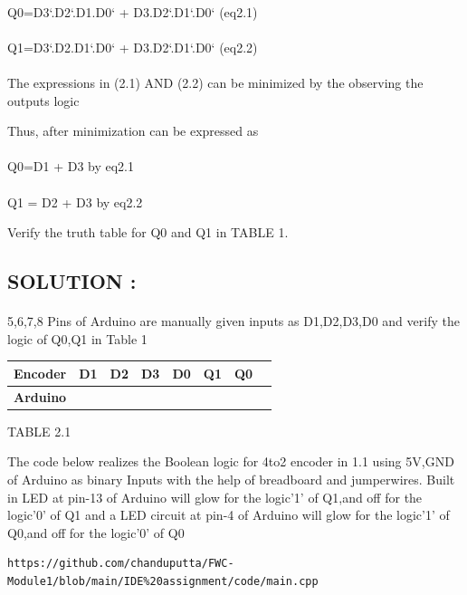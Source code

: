 \documentclass[10pt, a4paper]{article}
\begin{document}
\paragraph{}
{Q0=D3`.D2`.D1.D0` + D3.D2`.D1`.D0`                 (eq2.1)}
\paragraph{}
{Q1=D3`.D2.D1`.D0` + D3.D2`.D1`.D0`                          (eq2.2)}
 
 \paragraph{}
The expressions in (2.1) AND (2.2) can be minimized by the observing the outputs logic

Thus, after minimization  can
be expressed as
\paragraph{}
Q0=D1 + D3    by eq2.1
\paragraph{}  
Q1 = D2 + D3  by eq2.2

Verify the truth table for Q0 and Q1 in TABLE 1.


\subsection{SOLUTION :}

\paragraph{}
5,6,7,8 Pins of Arduino are manually given inputs as D1,D2,D3,D0 and verify the logic of Q0,Q1 in Table 1

\begin{tabularx}{0.60\textwidth} { 
  | >{\centering\arraybackslash}X 
  | >{\centering\arraybackslash}X 
  | >{\centering\arraybackslash}X 
  | >{\centering\arraybackslash}X 
  | >{\centering\arraybackslash}X 
  | >{\centering\arraybackslash}X
  | >{\centering\arraybackslash}X
  | >{\centering\arraybackslash}X|}

\hline
 \textbf{Encoder} & D1 & D2 & D3 & D0 & Q1 & Q0 \\
\hline
\textbf{Arduino} & 5 & 6 & 7 & 8 & 13 & 4 \\  
\hline
\end{tabularx}
 
\begin{center}
TABLE 2.1
\end{center}

The code below realizes the Boolean logic for 4to2 encoder in 1.1  using 5V,GND of Arduino as binary Inputs with the help of breadboard and jumperwires.
Built in LED at pin-13 of Arduino will glow for the logic'1' of Q1,and off for the logic'0' of Q1  and a LED circuit at pin-4 of Arduino will glow for the logic'1' of Q0,and off for the logic'0' of Q0
\begin{lstlisting}
https://github.com/chanduputta/FWC-Module1/blob/main/IDE%20assignment/code/main.cpp
\end{lstlisting}

\end{document}
